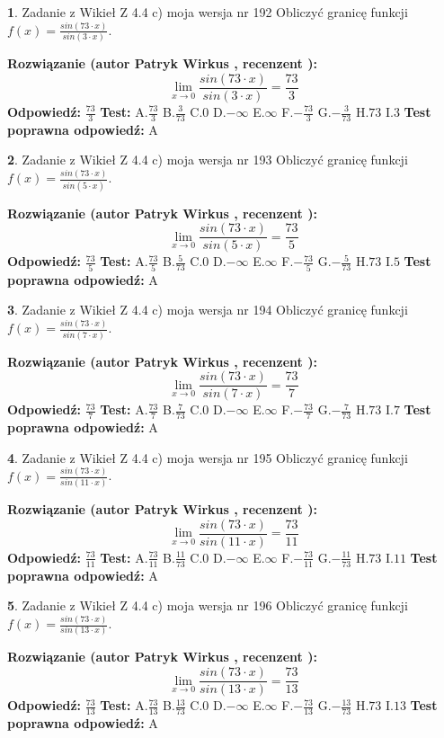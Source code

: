 \documentclass[12pt, a4paper]{article}
\theoremstyle{definition} %
\newtheorem{zad}{}
\newcommand{\zadStart}[1]{\begin{zad}#1\newline}
\newcommand{\zadStop}{\end{zad}}
\newcommand{\rozwStart}[2]{\noindent \textbf{Rozwiązanie (autor #1 , recenzent #2): }\newline}
\newcommand{\rozwStop}{\newline}
\newcommand{\odpStart}{\noindent \textbf{Odpowiedź:}\newline}
\newcommand{\odpStop}{\newline}
\newcommand{\testStart}{\noindent \textbf{Test:}\newline}
\newcommand{\testStop}{\newline}
\newcommand{\kluczStart}{\noindent \textbf{Test poprawna odpowiedź:}\newline}
\newcommand{\kluczStop}{\newline}
\begin{document}
\zadStart{Zadanie z Wikieł Z 4.4 c) moja wersja nr 192}
Obliczyć granicę funkcji $f(x)=\frac{sin(73\cdot x)}{sin(3\cdot x)}$.
\zadStop
\rozwStart{Patryk Wirkus}{}
$$\lim\limits_{x\to 0}\frac{sin(73\cdot x)}{sin(3\cdot x)}=
\frac{73}{3}$$
\rozwStop
\odpStart
$\frac{73}{3}$
\odpStop
\testStart
A.$\frac{73}{3}$
B.$\frac{3}{73}$
C.$0$
D.$-\infty$
E.$\infty$
F.$-\frac{73}{3}$
G.$-\frac{3}{73}$
H.$73$
I.$3$
\testStop
\kluczStart
A
\kluczStop



\zadStart{Zadanie z Wikieł Z 4.4 c) moja wersja nr 193}
Obliczyć granicę funkcji $f(x)=\frac{sin(73\cdot x)}{sin(5\cdot x)}$.
\zadStop
\rozwStart{Patryk Wirkus}{}
$$\lim\limits_{x\to 0}\frac{sin(73\cdot x)}{sin(5\cdot x)}=
\frac{73}{5}$$
\rozwStop
\odpStart
$\frac{73}{5}$
\odpStop
\testStart
A.$\frac{73}{5}$
B.$\frac{5}{73}$
C.$0$
D.$-\infty$
E.$\infty$
F.$-\frac{73}{5}$
G.$-\frac{5}{73}$
H.$73$
I.$5$
\testStop
\kluczStart
A
\kluczStop



\zadStart{Zadanie z Wikieł Z 4.4 c) moja wersja nr 194}
Obliczyć granicę funkcji $f(x)=\frac{sin(73\cdot x)}{sin(7\cdot x)}$.
\zadStop
\rozwStart{Patryk Wirkus}{}
$$\lim\limits_{x\to 0}\frac{sin(73\cdot x)}{sin(7\cdot x)}=
\frac{73}{7}$$
\rozwStop
\odpStart
$\frac{73}{7}$
\odpStop
\testStart
A.$\frac{73}{7}$
B.$\frac{7}{73}$
C.$0$
D.$-\infty$
E.$\infty$
F.$-\frac{73}{7}$
G.$-\frac{7}{73}$
H.$73$
I.$7$
\testStop
\kluczStart
A
\kluczStop



\zadStart{Zadanie z Wikieł Z 4.4 c) moja wersja nr 195}
Obliczyć granicę funkcji $f(x)=\frac{sin(73\cdot x)}{sin(11\cdot x)}$.
\zadStop
\rozwStart{Patryk Wirkus}{}
$$\lim\limits_{x\to 0}\frac{sin(73\cdot x)}{sin(11\cdot x)}=
\frac{73}{11}$$
\rozwStop
\odpStart
$\frac{73}{11}$
\odpStop
\testStart
A.$\frac{73}{11}$
B.$\frac{11}{73}$
C.$0$
D.$-\infty$
E.$\infty$
F.$-\frac{73}{11}$
G.$-\frac{11}{73}$
H.$73$
I.$11$
\testStop
\kluczStart
A
\kluczStop



\zadStart{Zadanie z Wikieł Z 4.4 c) moja wersja nr 196}
Obliczyć granicę funkcji $f(x)=\frac{sin(73\cdot x)}{sin(13\cdot x)}$.
\zadStop
\rozwStart{Patryk Wirkus}{}
$$\lim\limits_{x\to 0}\frac{sin(73\cdot x)}{sin(13\cdot x)}=
\frac{73}{13}$$
\rozwStop
\odpStart
$\frac{73}{13}$
\odpStop
\testStart
A.$\frac{73}{13}$
B.$\frac{13}{73}$
C.$0$
D.$-\infty$
E.$\infty$
F.$-\frac{73}{13}$
G.$-\frac{13}{73}$
H.$73$
I.$13$
\testStop
\kluczStart
A
\kluczStop
\end{document}
